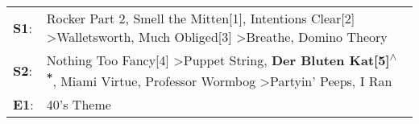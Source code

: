 \begin{supertabular}{p{0.03\textwidth}p{0.92\textwidth}}
 \textbf{S1}:  &                    Rocker Part 2\textsuperscript{}, \enspace Smell the Mitten[1]\textsuperscript{}, \enspace Intentions Clear[2]\textsuperscript{} \textgreater \enspace Walletsworth\textsuperscript{}, \enspace Much Obliged[3]\textsuperscript{} \textgreater \enspace Breathe\textsuperscript{}, \enspace Domino Theory\textsuperscript{}  \enspace  \\
 \textbf{S2}:  &  Nothing Too Fancy[4]\textsuperscript{} \textgreater \enspace Puppet String\textsuperscript{}, \enspace \textbf{Der Bluten Kat[5]\textsuperscript{$\wedge$*}}, \enspace Miami Virtue\textsuperscript{}, \enspace Professor Wormbog\textsuperscript{} \textgreater \enspace Partyin' Peeps\textsuperscript{}, \enspace I Ran\textsuperscript{}  \enspace  \\
 \textbf{E1}:  &                                                                                                                                                                                                                                                                                                                  40's Theme\textsuperscript{}  \enspace  \\
\end{supertabular}

